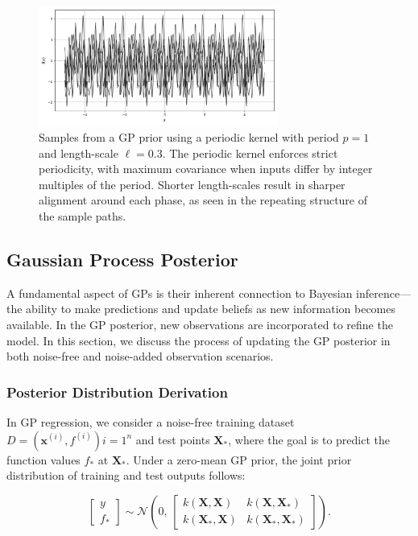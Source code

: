 \documentclass{ut-thesis}
\begin{document}
\begin{figure}[htbp]
    \centering
    \includegraphics[width=0.7\textwidth]{periodic.png}
    \caption[Gaussian Process samples with periodic kernel]{
        Samples from a GP prior using a periodic kernel with period \( p = 1 \) and length-scale \( \ell = 0.3 \).
        The periodic kernel enforces strict periodicity, with maximum covariance when inputs differ by integer multiples of the period.
        Shorter length-scales result in sharper alignment around each phase, as seen in the repeating structure of the sample paths.
    }
    \label{fig:periodic_gp_samples}
\end{figure}

\newpage
\subsection{Gaussian Process Posterior}

A fundamental aspect of GPs is their inherent connection to Bayesian inference—the ability to make predictions and update beliefs as new information becomes available. In the GP posterior, new observations are incorporated to refine the model. In this section, we discuss the process of updating the GP posterior in both noise-free and noise-added observation scenarios.

\subsubsection{Posterior Distribution Derivation}

In GP regression, we consider a noise-free training dataset
$ D = {(\mathbf{x}^{(i)}, f^{(i)})}{i=1}^{n} $ and test points $ \mathbf{X_*}$, where the goal is to predict the function values $ f_* $ at $ \mathbf{X_*} $. Under a zero-mean GP prior, the joint prior distribution of training and test outputs follows:

\begin{equation}
    \begin{bmatrix}
y \\[6pt]
f_*
\end{bmatrix}
\sim
\mathcal{N}\!\left(
0,\,
\begin{bmatrix}
k(\mathbf{X}, \mathbf{X}) & k(\mathbf{X}, \mathbf{X_*}) \\[6pt]
k(\mathbf{X_*}, \mathbf{X}) & k(\mathbf{X_*}, \mathbf{X_*})
\end{bmatrix}
\right).
\end{equation}
\end{document}

